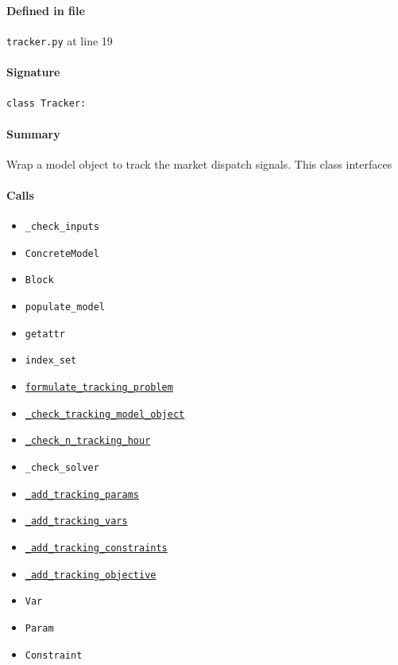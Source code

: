 \documentclass[11pt]{report}
\begin{document}
\paragraph{Defined in file} \texttt{tracker.py} at line 19
\paragraph{Signature} \texttt{class Tracker:}
\paragraph{Summary} Wrap a model object to track the market dispatch signals. This class interfaces
\paragraph{Calls}
\begin{itemize}[leftmargin=*]
  \item \texttt{\_check\_inputs}
  \item \texttt{ConcreteModel}
  \item \texttt{Block}
  \item \texttt{populate\_model}
  \item \texttt{getattr}
  \item \texttt{index\_set}
  \item \hyperref[def:tracker.py:Tracker.formulate_tracking_problem:L147]{\texttt{formulate\_tracking\_problem}}
  \item \hyperref[def:tracker.py:Tracker._check_tracking_model_object:L79]{\texttt{\_check\_tracking\_model\_object}}
  \item \hyperref[def:tracker.py:Tracker._check_n_tracking_hour:L117]{\texttt{\_check\_n\_tracking\_hour}}
  \item \texttt{\_check\_solver}
  \item \hyperref[def:tracker.py:Tracker._add_tracking_params:L187]{\texttt{\_add\_tracking\_params}}
  \item \hyperref[def:tracker.py:Tracker._add_tracking_vars:L166]{\texttt{\_add\_tracking\_vars}}
  \item \hyperref[def:tracker.py:Tracker._add_tracking_constraints:L219]{\texttt{\_add\_tracking\_constraints}}
  \item \hyperref[def:tracker.py:Tracker._add_tracking_objective:L244]{\texttt{\_add\_tracking\_objective}}
  \item \texttt{Var}
  \item \texttt{Param}
  \item \texttt{Constraint}

\end{itemize}
\end{document}

